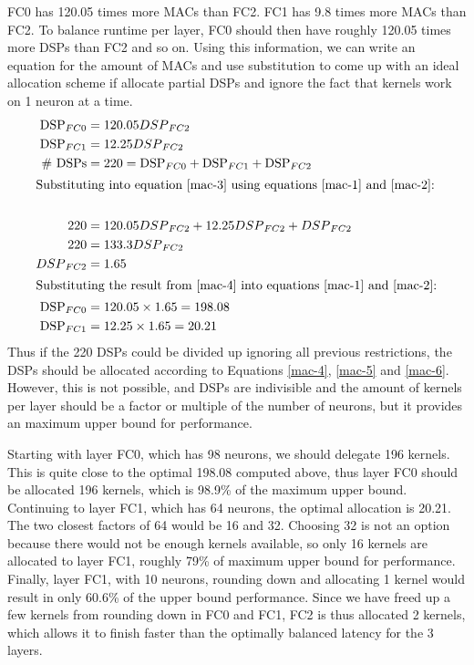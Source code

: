 FC0 has 120.05 times more MACs than FC2. FC1 has 9.8 times more MACs than FC2. To balance runtime per layer, FC0 should then have roughly 120.05 times more DSPs than FC2 and so on. Using this information, we can write an equation for the amount of MACs and use substitution to come up with an ideal allocation scheme if allocate partial DSPs and ignore the fact that kernels work on 1 neuron at a time.
\begin{align}
	\text{DSP}_{FC0} &= 120.05 {DSP}_{FC2} \label{mac-1}\\	
	\text{DSP}_{FC1} &= 12.25 {DSP}_{FC2} \label{mac-2}\\
	\text{\# DSPs} &= 220 = \text{DSP}_{FC0} + \text{DSP}_{FC1} + \text{DSP}_{FC2} \label{mac-3}\\	
	\intertext{Substituting into equation \ref{mac-3} using equations \ref{mac-1} and \ref{mac-2}:}\\
	220 &= 120.05 {DSP}_{FC2} + 12.25  {DSP}_{FC2} +  {DSP}_{FC2} \\
	220 &= 133.3 {DSP}_{FC2}\\ 
	{DSP}_{FC2} &= 1.65 \label{mac-4}\\
	\intertext{Substituting the result from \ref{mac-4} into equations \ref{mac-1} and \ref{mac-2}:}
	\text{DSP}_{FC0} &= 120.05 \times 1.65 = 198.08\label{mac-5}\\	
	\text{DSP}_{FC1} &= 12.25 \times 1.65 = 20.21\label{mac-6}	
\end{align}
Thus if the 220 DSPs could be divided up ignoring all previous restrictions, the DSPs should be allocated according to Equations \ref{mac-4}, \ref{mac-5} and \ref{mac-6}. However, this is not possible, and DSPs are indivisible and the amount of kernels per layer should be a factor or multiple of the number of neurons, but it provides an maximum upper bound for performance.

Starting with layer FC0, which has 98 neurons, we should delegate 196 kernels. This is quite close to the optimal 198.08 computed above, thus layer FC0 should be allocated 196 kernels, which is 98.9\% of the maximum upper bound. Continuing to layer FC1, which has 64 neurons, the optimal allocation is 20.21. The two closest factors of 64 would be 16 and 32. Choosing 32 is not an option because there would not be enough kernels available, so only 16 kernels are allocated to layer FC1, roughly 79\% of maximum upper bound for performance. Finally, layer FC1, with 10 neurons, rounding down and allocating 1 kernel would result in only 60.6\% of the upper bound performance. Since we have freed up a few kernels from rounding down in FC0 and FC1, FC2 is thus allocated 2 kernels, which allows it to finish faster than the optimally balanced latency for the 3 layers.

